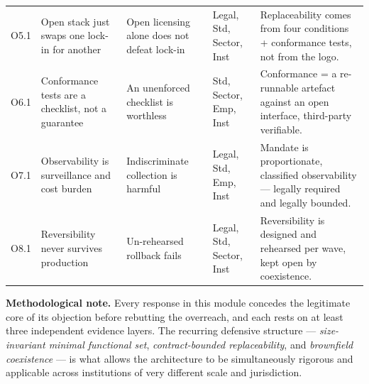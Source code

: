 \documentclass[11pt,a4paper,twoside]{book}
\begin{document}
\begin{longtable}{@{}p{}p{}p{}p{}p{}@{}}
O5.1 & Open stack just swaps one lock-in for another &
Open licensing alone does not defeat lock-in &
Legal, Std, Sector, Inst &
Replaceability comes from four conditions + conformance tests, not from the logo. \\

O6.1 & Conformance tests are a checklist, not a guarantee &
An unenforced checklist is worthless &
Std, Sector, Emp, Inst &
Conformance = a re-runnable artefact against an open interface, third-party verifiable. \\

O7.1 & Observability is surveillance and cost burden &
Indiscriminate collection is harmful &
Legal, Std, Emp, Inst &
Mandate is proportionate, classified observability --- legally required and legally bounded. \\

O8.1 & Reversibility never survives production &
Un-rehearsed rollback fails &
Legal, Std, Sector, Inst &
Reversibility is designed and rehearsed per wave, kept open by coexistence. \\

\end{longtable}

\bigskip
\noindent\textbf{Methodological note.} Every response in this module concedes
the legitimate core of its objection before rebutting the overreach, and
each rests on at least three independent evidence layers. The recurring
defensive structure --- \emph{size-invariant minimal functional set},
\emph{contract-bounded replaceability}, and \emph{brownfield coexistence} ---
is what allows the architecture to be simultaneously rigorous and applicable
across institutions of very different scale and jurisdiction.

\backmatter

\printbibliography[heading=bibintoc]
\end{document}
